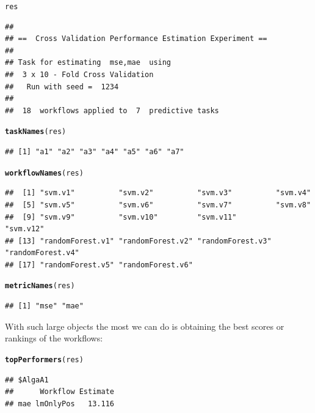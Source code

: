 \documentclass[10pt,a4paper]{article}\usepackage[]{graphicx}\usepackage[]{color}
\makeatletter
\newcommand{\hlstd}[1]{\textcolor[rgb]{0.345,0.345,0.345}{#1}}%
\newcommand{\hlkwd}[1]{\textcolor[rgb]{0.737,0.353,0.396}{\textbf{#1}}}%
\newenvironment{kframe}{%
 \def\at@end@of@kframe{}%
 \ifinner\ifhmode%
  \def\at@end@of@kframe{\end{minipage}}%
  \begin{minipage}{\columnwidth}%
 \fi\fi%
 \def\FrameCommand##1{\hskip\@totalleftmargin \hskip-\fboxsep
 \colorbox{shadecolor}{##1}\hskip-\fboxsep
     \hskip-\linewidth \hskip-\@totalleftmargin \hskip\columnwidth}%
 \MakeFramed {\advance\hsize-\width
   \@totalleftmargin\z@ \linewidth\hsize
   \@setminipage}}%
 {\par\unskip\endMakeFramed%
 \at@end@of@kframe}
\newenvironment{knitrout}{}{} %
\makeatother
\begin{document}
\begin{knitrout}\small
{}\color{fgcolor}\begin{kframe}
\begin{alltt}
\hlstd{res}
\end{alltt}
\begin{verbatim}
## 
## ==  Cross Validation Performance Estimation Experiment ==
## 
## Task for estimating  mse,mae  using
##  3 x 10 - Fold Cross Validation
## 	 Run with seed =  1234 
## 
##  18  workflows applied to  7  predictive tasks
\end{verbatim}
\begin{alltt}
\hlkwd{taskNames}\hlstd{(res)}
\end{alltt}
\begin{verbatim}
## [1] "a1" "a2" "a3" "a4" "a5" "a6" "a7"
\end{verbatim}
\begin{alltt}
\hlkwd{workflowNames}\hlstd{(res)}
\end{alltt}
\begin{verbatim}
##  [1] "svm.v1"          "svm.v2"          "svm.v3"          "svm.v4"         
##  [5] "svm.v5"          "svm.v6"          "svm.v7"          "svm.v8"         
##  [9] "svm.v9"          "svm.v10"         "svm.v11"         "svm.v12"        
## [13] "randomForest.v1" "randomForest.v2" "randomForest.v3" "randomForest.v4"
## [17] "randomForest.v5" "randomForest.v6"
\end{verbatim}
\begin{alltt}
\hlkwd{metricNames}\hlstd{(res)}
\end{alltt}
\begin{verbatim}
## [1] "mse" "mae"
\end{verbatim}
\end{kframe}
\end{knitrout}

With such large objects the most we can do is obtaining the best
scores or rankings of the workflows:

\begin{knitrout}\scriptsize
{}\color{fgcolor}\begin{kframe}
\begin{alltt}
\hlkwd{topPerformers}\hlstd{(res)}
\end{alltt}
\begin{verbatim}
## $AlgaA1
##      Workflow Estimate
## mae lmOnlyPos   13.116
\end{verbatim}
\end{kframe}
\end{knitrout}
\end{document}
